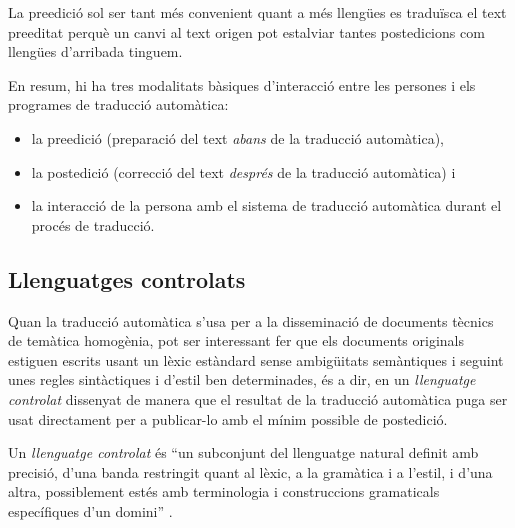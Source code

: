 La preedició sol ser tant més convenient quant a més llengües es
traduïsca el text preeditat perquè un canvi al text origen pot
estalviar tantes postedicions com llengües d'arribada tinguem.

En resum, hi ha tres modalitats bàsiques d'interacció entre les
persones i els programes de traducció automàtica:
\begin{itemize}
\item la preedició (preparació del text \emph{abans} de la traducció
  automàtica),
\item la postedició (correcció del text \emph{després} de la traducció
  automàtica) i
\item la interacció de la persona amb el sistema de traducció
  automàtica durant el procés de traducció.
\end{itemize}


\subsection{Llenguatges controlats}
\label{ss:llecon}
Quan la traducció automàtica s'usa per a la disseminació de documents
tècnics de temàtica homogènia, pot ser interessant fer que els
documents originals estiguen escrits usant un lèxic estàndard sense
ambigüitats semàn\-ti\-ques i seguint unes regles sintàctiques i
d'estil ben determinades, és a dir, en un \emph{llenguatge controlat}
\citep{wojcik96u,arnold94b,o2003controlling} dissenyat de manera que
el resultat de la traducció automàtica puga ser usat directament per a
publicar-lo amb el mínim possible de postedició.

Un \emph{llenguatge controlat} és ``un subconjunt del llenguatge
natural definit amb precisió, d'una banda restringit quant al lèxic, a
la gramàtica i a l'estil, i d'una altra, possiblement estés amb
terminologia i construccions gramaticals específiques d'un domini''
\citep{huijsen98u}.

